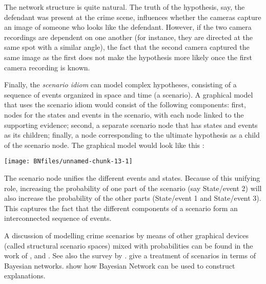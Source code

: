 \documentclass{article}
\begin{document}
\noindent The network structure is quite natural. The truth of the hypothesis, say, the defendant was present at the crime scene, influences whether the cameras capture an image of someone who looks like the defendant. However, if the two camera recordings are dependent on one another (for instance, they are directed at the same spot with a similar angle), the fact that the second camera captured the same image as the first does not make the hypothesis more likely once the first camera recording is known.











Finally, the \textit{scenario idiom} can model  complex hypotheses, consisting of a sequence of events organized in space and time (a scenario). A graphical model that uses the scenario idiom would consist of the following components: first, nodes for the states and events in the scenario, with each node linked to the supporting evidence; second, a separate scenario node that has states and events as its children; finally, a node corresponding to the ultimate hypothesis as a child of the scenario node. The graphical 
model would look like this %
\citep{vlek2014building}:

\begin{center}\texttt{[image: BNfiles/unnamed-chunk-13-1]} \end{center}





\noindent
 The scenario node unifies the different events and states.  
 Because of this unifying role, increasing the probability of one part of the scenario (say \textsf{State/event 2}) will also increase the probability of the other parts (\textsf{State/event 1} and  \textsf{State/event 3}). This captures the fact that  the different components 
 of a scenario form an interconnected sequence of events. 
 



A discussion
of modelling crime scenarios by means of other graphical devices (called structural scenario spaces) mixed with probabilities can be found in the work of 
\cite{shen2007ScenariodrivenDecisionSupporta}, \cite{bex2011ArgumentsStoriesCriminal, bex2015IntegratedTheoryCausal} and
\cite{verheijproof2017}.
See also the survey by \citet{di2018evidential}.
\cite{dawid2018graphical} 
give a treatment of scenarios in terms of  Bayesian networks. \cite{lacave2002ReviewExplanationMethodsa} show how Bayesian Network can be used to construct explanations.
\end{document}
